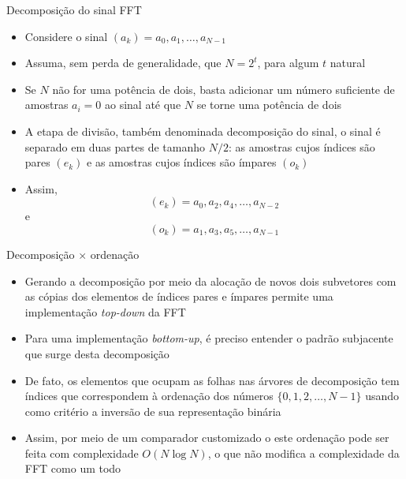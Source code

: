 \begin{frame}[fragile]{Decomposição do sinal FFT}

    \begin{itemize}
        \item Considere o sinal $(a_k) = a_0, a_1, \ldots, a_{N-1}$

        \item Assuma, sem perda de generalidade, que $N = 2^t$, para algum $t$ natural

        \item Se $N$ não for uma potência de dois, basta adicionar um número suficiente de amostras
            $a_i = 0$ ao sinal até que $N$ se torne uma potência de dois

        \item A etapa de divisão, também denominada decomposição do sinal, o sinal é separado
            em duas partes de tamanho $N/2$: as amostras cujos índices são pares $(e_k)$ e as 
            amostras cujos índices são ímpares $(o_k)$

        \item Assim,
        \[
            (e_k) = a_0, a_2, a_4, \ldots, a_{N - 2}
        \]
        e
        \[
            (o_k) = a_1, a_3, a_5, \ldots, a_{N - 1}
        \]
    \end{itemize}

\end{frame}



\begin{frame}[fragile]{Decomposição $\times$ ordenação}

    \begin{itemize}
        \item Gerando a decomposição por meio da alocação de novos dois subvetores com as cópias
            dos elementos de índices pares e ímpares permite uma implementação \textit{top-down}
            da FFT

        \item Para uma implementação \textit{bottom-up}, é preciso entender
            o padrão subjacente que surge desta decomposição

        \item De fato, os elementos que ocupam as folhas nas árvores de decomposição tem índices
            que correspondem à ordenação dos números $\{ 0, 1, 2, \ldots, N - 1\}$ usando como
            critério a inversão de sua representação binária

        \item Assim, por meio de um comparador customizado o este ordenação pode ser feita 
            com complexidade $O(N\log N)$, o que não modifica a complexidade da FFT como um todo
    \end{itemize}

\end{frame}

